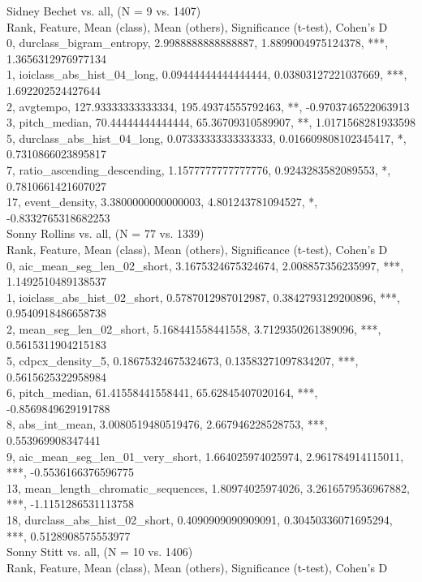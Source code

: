 Sidney Bechet vs. all, (N = 9 vs. 1407)\\
Rank, Feature, Mean (class), Mean (others), Significance (t-test), Cohen's D\\
0, durclass_bigram_entropy, 2.9988888888888887, 1.8899004975124378, ***, 1.3656312976977134\\
1, ioiclass_abs_hist_04_long, 0.09444444444444444, 0.03803127221037669, ***, 1.692202524427644\\
2, avgtempo, 127.93333333333334, 195.49374555792463, **, -0.9703746522063913\\
3, pitch_median, 70.44444444444444, 65.36709310589907, **, 1.0171568281933598\\
5, durclass_abs_hist_04_long, 0.07333333333333333, 0.016609808102345417, *, 0.7310866023895817\\
7, ratio_ascending_descending, 1.1577777777777776, 0.9243283582089553, *, 0.7810661421607027\\
17, event_density, 3.3800000000000003, 4.801243781094527, *, -0.8332765318682253\\
Sonny Rollins vs. all, (N = 77 vs. 1339)\\
Rank, Feature, Mean (class), Mean (others), Significance (t-test), Cohen's D\\
0, aic_mean_seg_len_02_short, 3.1675324675324674, 2.008857356235997, ***, 1.1492510489138537\\
1, ioiclass_abs_hist_02_short, 0.5787012987012987, 0.3842793129200896, ***, 0.9540918486658738\\
2, mean_seg_len_02_short, 5.168441558441558, 3.7129350261389096, ***, 0.5615311904215183\\
5, cdpcx_density_5, 0.18675324675324673, 0.13583271097834207, ***, 0.5615625322958984\\
6, pitch_median, 61.41558441558441, 65.62845407020164, ***, -0.8569849629191788\\
8, abs_int_mean, 3.0080519480519476, 2.667946228528753, ***, 0.553969908347441\\
9, aic_mean_seg_len_01_very_short, 1.664025974025974, 2.961784914115011, ***, -0.5536166376596775\\
13, mean_length_chromatic_sequences, 1.80974025974026, 3.2616579536967882, ***, -1.1151286531113758\\
18, durclass_abs_hist_02_short, 0.4090909090909091, 0.30450336071695294, ***, 0.5128908575553977\\
Sonny Stitt vs. all, (N = 10 vs. 1406)\\
Rank, Feature, Mean (class), Mean (others), Significance (t-test), Cohen's D\\
